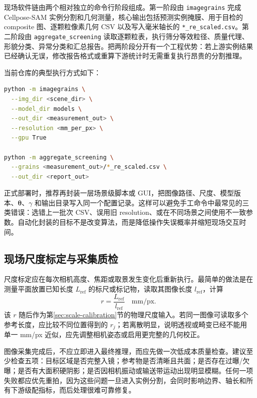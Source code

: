 现场软件链由两个相对独立的命令行阶段组成。第一阶段由 \texttt{imagegrains} 完成 Cellpose-SAM 实例分割和几何测量，核心输出包括预测实例掩膜、用于目检的 composite 图、逐颗粒像素几何 CSV 以及写入毫米轴长的 \texttt{*\_re\_scaled.csv}。第二阶段由 \texttt{aggregate\_screening} 读取逐颗粒表，执行筛分等效粒径、质量代理、形貌分类、异常分类和汇总报告。把两阶段分开有一个工程优势：若上游实例结果已经确认无误，修改报告格式或重算下游统计时无需重复执行昂贵的分割推理。

当前仓库的典型执行方式如下：
\begin{lstlisting}[language=bash,caption={现场处理的两阶段命令示例。正式比赛应将 resolution 和冻结参数替换为本次标定/赛前校准值。}]
python -m imagegrains \
  --img_dir <scene_dir> \
  --model_dir models \
  --out_dir <measurement_out> \
  --resolution <mm_per_px> \
  --gpu True

python -m aggregate_screening \
  --grains <measurement_out>/*_re_scaled.csv \
  --out_dir <report_out>
\end{lstlisting}

正式部署时，推荐再封装一层场景级脚本或 GUI，把图像路径、尺度、模型版本、$\boldsymbol{\theta}$、$\gamma$ 和输出目录写入同一个配置记录。这样可以避免手工命令中最常见的三类错误：选错上一批次 CSV、误用旧 resolution、或在不同场景之间使用不一致参数。自动化封装的目标不是改变算法，而是降低操作失误概率并缩短现场交互时间。

\subsection{现场尺度标定与采集质检}
\label{sec:field-calibration-qc}

尺度标定应在每次相机高度、焦距或取景发生变化后重新执行。最简单的做法是在测量平面放置已知长度 $L_{\mathrm{ref}}$ 的标尺或标记物，读取其图像长度 $l_{\mathrm{ref}}$，计算
\begin{equation}
 r=\frac{L_{\mathrm{ref}}}{l_{\mathrm{ref}}}\quad \mathrm{mm/px}.
\label{eq:field-resolution}
\end{equation}
该 $r$ 随后作为第\ref{sec:scale-calibration}节的物理尺度输入。若同一图像可读取多个参考长度，应比较不同位置得到的 $r_j$；若离散明显，说明透视或畸变已经不能用单一 mm/px 近似，应先调整相机姿态或启用更完整的几何校正。

图像采集完成后，不应立即进入最终推理，而应先做一次低成本质量检查。建议至少检查五项：目标区域是否完整入镜；参考物是否清晰且共面；是否存在过曝/欠曝；是否有大面积硬阴影；是否因相机振动或输送带运动出现明显模糊。任何一项失败都应优先重拍，因为这些问题一旦进入实例分割，会同时影响边界、轴长和所有下游级配指标，而后处理很难可靠修复。


